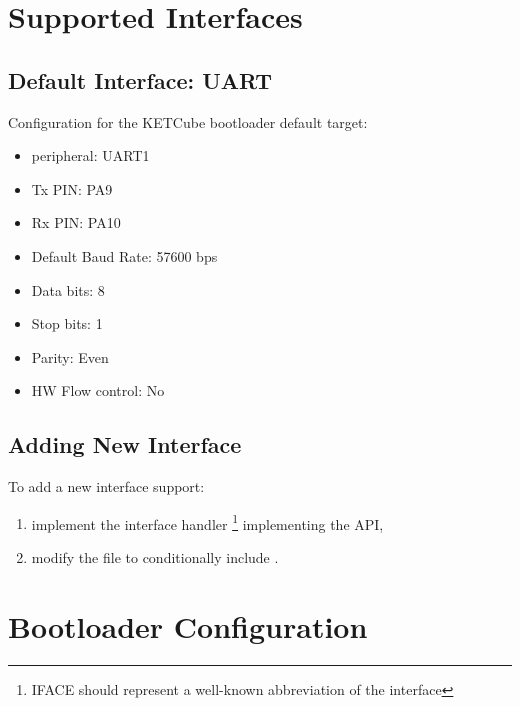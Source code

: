 
\clearpage
\section{Supported Interfaces}

\subsection{Default Interface: UART}

Configuration for the KETCube bootloader default target:
\begin{itemize}
  \item peripheral: UART1
  \item Tx PIN: PA9
  \item Rx PIN: PA10
  \item Default Baud Rate: 57600 bps
  \item Data bits: 8
  \item Stop bits: 1
  \item Parity: Even
  \item HW Flow control: No
\end{itemize}


\subsection{Adding New Interface}

To add a new interface support:
\begin{enumerate}
\item implement the interface handler \footnote{IFACE should represent a well-known abbreviation of the interface} implementing the  API,
\item modify the  file to conditionally include .
\end{enumerate}

\clearpage
\section{Bootloader Configuration} \label{sec:settings}

